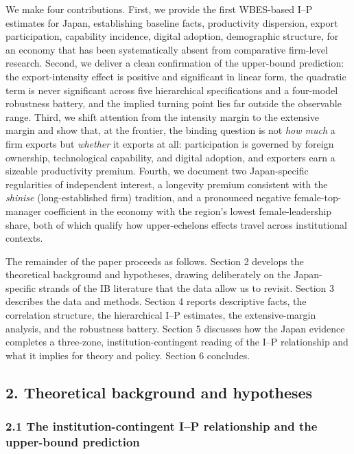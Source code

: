 \documentclass[
  12pt,a4paper]{article}
\begin{document}
We make four contributions. First, we provide the first WBES-based I--P
estimates for Japan, establishing baseline facts, productivity
dispersion, export participation, capability incidence, digital
adoption, demographic structure, for an economy that has been
systematically absent from comparative firm-level research. Second, we
deliver a clean confirmation of the upper-bound prediction: the
export-intensity effect is positive and significant in linear form, the
quadratic term is never significant across five hierarchical
specifications and a four-model robustness battery, and the implied
turning point lies far outside the observable range. Third, we shift
attention from the intensity margin to the extensive margin and show
that, at the frontier, the binding question is not \emph{how much} a
firm exports but \emph{whether} it exports at all: participation is
governed by foreign ownership, technological capability, and digital
adoption, and exporters earn a sizeable productivity premium. Fourth, we
document two Japan-specific regularities of independent interest, a
longevity premium consistent with the \emph{shinise} (long-established
firm) tradition, and a pronounced negative female-top-manager
coefficient in the economy with the region's lowest female-leadership
share, both of which qualify how upper-echelons effects travel across
institutional contexts.

The remainder of the paper proceeds as follows. Section 2 develops the
theoretical background and hypotheses, drawing deliberately on the
Japan-specific strands of the IB literature that the data allow us to
revisit. Section 3 describes the data and methods. Section 4 reports
descriptive facts, the correlation structure, the hierarchical I--P
estimates, the extensive-margin analysis, and the robustness battery.
Section 5 discusses how the Japan evidence completes a three-zone,
institution-contingent reading of the I--P relationship and what it
implies for theory and policy. Section 6 concludes.

\hypertarget{theoretical-background-and-hypotheses}{%
\subsection{2. Theoretical background and
hypotheses}\label{theoretical-background-and-hypotheses}}

\hypertarget{the-institution-contingent-ip-relationship-and-the-upper-bound-prediction}{%
\subsubsection{2.1 The institution-contingent I--P relationship and the
upper-bound
prediction}\label{the-institution-contingent-ip-relationship-and-the-upper-bound-prediction}}
\end{document}
